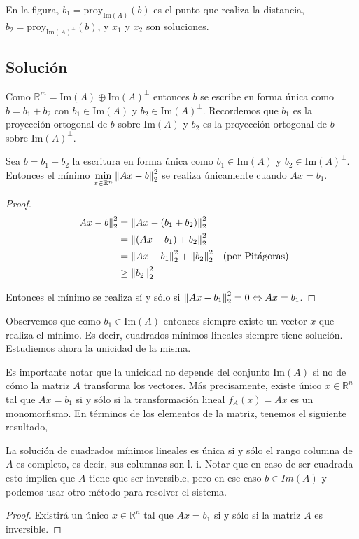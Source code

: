 En la figura, $b_1 = \text{proy}_{\text{Im}(A)}(b)$ es el punto que realiza la distancia, $b_2 = \text{proy}_{\text{Im}(A)^{\perp}}(b)$, y $x_1$ y $x_2$ son soluciones.

\subsection{Solución}

Como $\mathbb{R}^m = \text{Im}(A) \oplus \text{Im}(A)^{\perp}$ entonces $b$ se escribe en forma única como $b = b_1 + b_2$ con $b_1 \in \text{Im}(A)$ y $b_2 \in \text{Im}(A)^{\perp}$. Recordemos que $b_1$ es la proyección ortogonal de $b$ sobre $\text{Im}(A)$ y $b_2$ es la proyección ortogonal de $b$ sobre $\text{Im}(A)^{\perp}$.

\begin{propo}
Sea $b = b_1 + b_2$ la escritura en forma única como $b_1 \in \text{Im}(A)$ y $b_2 \in \text{Im}(A)^{\perp}$. Entonces el mínimo $\min\limits_{x \in  \mathbb{R}^n}\left\lVert Ax - b\right\rVert_2^2$ se realiza únicamente cuando $Ax = b_1$.

\begin{proof}
\begin{align*}
\left\lVert Ax - b\right\rVert_2^2 &= \left\lVert Ax - (b_1 + b_2)\right\rVert_2^2				&\\
				&= \left\lVert(Ax - b_1) + b_2\right\rVert_2^2				&\\
				&= \left\lVert Ax - b_1\right\rVert_2^2 + \left\lVert b_2\right\rVert_2^2		&\text{(por Pitágoras)}\\
				&\geq \left\lVert b_2\right\rVert_2^2
\end{align*}

Entonces el mínimo se realiza sí y sólo si $\left\lVert Ax - b_1\right\rVert_2^2 = 0 \Leftrightarrow Ax = b_1$.

\end{proof}
\end{propo}

Observemos que como $b_1 \in \text{Im}(A)$ entonces siempre existe un vector $x$ que realiza el mínimo. Es decir, cuadrados mínimos lineales siempre tiene solución. Estudiemos ahora la unicidad de la misma.

Es importante notar que la unicidad no depende del conjunto $\text{Im}(A)$ si no de cómo la matriz $A$ transforma los vectores. Más precisamente, existe único $x \in \mathbb{R}^n$ tal que $Ax = b_1$ si y sólo si la transformación lineal $f_A(x) = Ax$ es un monomorfismo. En términos de los elementos de la matriz, tenemos el siguiente resultado,

\begin{propo}
La solución de cuadrados mínimos lineales es única si y sólo el rango columna de $A$ es completo, es decir, sus columnas son l. i. Notar que en caso de ser cuadrada esto implica que $A$ tiene que ser inversible, pero en ese caso $b \in Im(A)$ y podemos usar otro método para resolver el sistema.

\begin{proof}
Existirá un único $x \in \mathbb{R}^n$ tal que $Ax = b_1$ si y sólo si la matriz $A$ es inversible.
\end{proof}
\end{propo}

